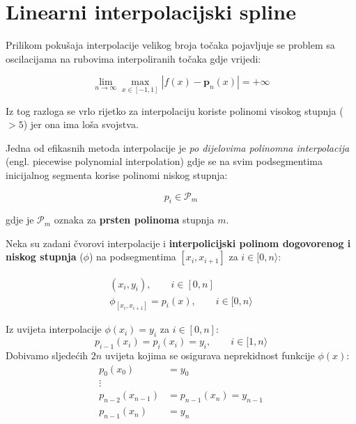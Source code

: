 \section{Linearni interpolacijski spline}

Prilikom pokušaja interpolacije velikog broja točaka pojavljuje se problem sa oscilacijama na rubovima interpoliranih točaka gdje vrijedi:

$$
\lim_{n\to \infty}\max_{x\in[-1,1]}\left|f(x)-{\mathbf p}_n(x)\right| = +\infty
$$

Iz tog razloga se vrlo rijetko za interpolaciju koriste polinomi visokog stupnja ($>5$) jer ona ima loša svojstva.

Jedna od efikasnih metoda interpolacije je \textit{po dijelovima polinomna interpolacija} (engl. piecewise polynomial interpolation) gdje se na svim podsegmentima inicijalnog segmenta korise polinomi niskog stupnja:

$$
p_i \in \mathcal{P}_m
$$

gdje je $\mathcal{P}_m$ oznaka za \textbf{prsten polinoma} stupnja $m$.

Neka su zadani čvorovi interpolacije i \textbf{interpolicijski polinom dogovorenog i niskog stupnja} ($\phi$) na podsegmentima $[x_i,x_{i+1}]$ za $i\in[0,n\rangle$:

\begin{gather}
(x_i,y_i),\qquad i\in[0,n]\nonumber\\
\phi_{[x_i,x_{i+1}]} = p_i(x),\qquad i\in[0,n\rangle
\end{gather}

\begin{conditionbox}
    Iz uvijeta interpolacije $\phi(x_i) = y_i$ za $i\in[0,n]$:
    \begin{equation}
        \label{ls_continuation}
        p_{i-1}(x_i) = p_i(x_i)=y_i,\qquad i\in[1,n\rangle
    \end{equation}
    Dobivamo sljedećih $2n$ uvijeta kojima se osigurava neprekidnost funkcije $\phi(x)$:
    \begin{align}
        \label{ls_match_first}
        p_0(x_0) &= y_0\\
        \vdots\quad&\nonumber\\
        \label{ls_match_transition}
        p_{n-2}(x_{n-1}) &= p_{n-1}(x_n) = y_{n-1}\\
        \label{ls_match_last}
        p_{n-1}(x_n) &= y_n
    \end{align}
\end{conditionbox}

